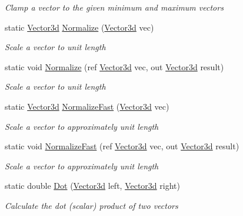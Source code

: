 \begin{DoxyCompactItemize}
\begin{DoxyCompactList}\small\item\em Clamp a vector to the given minimum and maximum vectors \end{DoxyCompactList}\item 
static \hyperlink{struct_open_t_k_1_1_vector3d}{Vector3d} \hyperlink{struct_open_t_k_1_1_vector3d_a491a35dda1a3afc7e623884f1ae175a1}{Normalize} (\hyperlink{struct_open_t_k_1_1_vector3d}{Vector3d} vec)
\begin{DoxyCompactList}\small\item\em Scale a vector to unit length \end{DoxyCompactList}\item 
static void \hyperlink{struct_open_t_k_1_1_vector3d_a33fbddd9977c1a289967ba0e1497d1b5}{Normalize} (ref \hyperlink{struct_open_t_k_1_1_vector3d}{Vector3d} vec, out \hyperlink{struct_open_t_k_1_1_vector3d}{Vector3d} result)
\begin{DoxyCompactList}\small\item\em Scale a vector to unit length \end{DoxyCompactList}\item 
static \hyperlink{struct_open_t_k_1_1_vector3d}{Vector3d} \hyperlink{struct_open_t_k_1_1_vector3d_a78b9fa216eb61a3489467def86e5b771}{Normalize\-Fast} (\hyperlink{struct_open_t_k_1_1_vector3d}{Vector3d} vec)
\begin{DoxyCompactList}\small\item\em Scale a vector to approximately unit length \end{DoxyCompactList}\item 
static void \hyperlink{struct_open_t_k_1_1_vector3d_abbecf0ee466bd83cdc59b045b8af1788}{Normalize\-Fast} (ref \hyperlink{struct_open_t_k_1_1_vector3d}{Vector3d} vec, out \hyperlink{struct_open_t_k_1_1_vector3d}{Vector3d} result)
\begin{DoxyCompactList}\small\item\em Scale a vector to approximately unit length \end{DoxyCompactList}\item 
static double \hyperlink{struct_open_t_k_1_1_vector3d_a11344599553ecbd7d4b5a8bb7d629f12}{Dot} (\hyperlink{struct_open_t_k_1_1_vector3d}{Vector3d} left, \hyperlink{struct_open_t_k_1_1_vector3d}{Vector3d} right)
\begin{DoxyCompactList}\small\item\em Calculate the dot (scalar) product of two vectors \end{DoxyCompactList}\item 

\end{DoxyCompactItemize}
